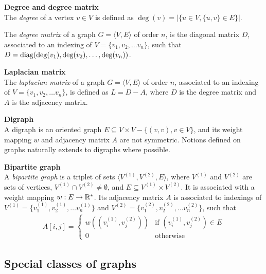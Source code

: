 \begin{definition}\textbf{Degree and degree matrix}\\
The \emph{degree} of a vertex $v \in V$ is defined as $\deg(v) = |\{u \in V, \{u,v\} \in E\}|$.

The \emph{degree matrix} of a graph $G = \langle V,E \rangle$ of order $n$, is the diagonal matrix $D$, associated to an indexing of $V = \{v_1, v_2, \ldots v_n\}$, such that $D = \operatorname{diag}(\deg(v_1), \deg(v_2), \ldots, \deg(v_n))$.
\end{definition}

\begin{definition}\textbf{Laplacian matrix}\\
The \emph{laplacian matrix} of a graph $G = \langle V,E \rangle$ of order $n$, associated to an indexing of $V = \{v_1, v_2, \ldots v_n\}$, is defined as $L = D - A$, where $D$ is the degree matrix and $A$ is the adjacency matrix.
\end{definition}

\begin{definition}\textbf{Digraph}\\
A digraph is an oriented graph \ie $E \subseteq V \times V - \{(v,v), v \in V\}$, and its weight mapping $w$ and adjacency matrix $A$ are not symmetric. Notions defined on graphs naturally extends to digraphs where possible.
\end{definition}

\begin{definition}\textbf{Bipartite graph}\\
A \emph{bipartite graph} is a triplet of sets $\langle V^{(1)}, V^{(2)}, E \rangle$, where $V^{(1)}$ and $V^{(2)}$ are sets of vertices, $V^{(1)} \cap V^{(2)} \neq \emptyset$, and $E \subseteq V^{(1)} \times V^{(2)}$. It is associated with a weight mapping $w: E \rightarrow \mathbb{R}^*$. Its adjacency matrix $A$ is associated to indexings of $V^{(1)} = \{v^{(1)}_1, v^{(1)}_2, \ldots v^{(1)}_n\}$ and $V^{(2)} = \{v^{(2)}_1, v^{(2)}_2, \ldots v^{(2)}_n\}$, such that
\begin{gather*}
A[i,j] =
 \begin{cases}
   w\left((v^{(1)}_i,v^{(2)}_j)\right) & \text{if } (v^{(1)}_i,v^{(2)}_j) \in E \\
   0 & \text{otherwise}
 \end{cases}
\end{gather*}
\end{definition}

\subsection{Special classes of graphs}

